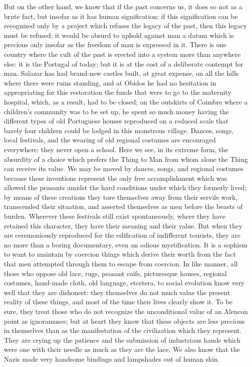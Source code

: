 \documentclass[11pt]{article}
\begin{document}
{{But on the other hand, we know that if the past concerns us, it does so not as a brute fact, but insofar as it has human signification; if this signification can be recognized only by a project which refuses the legacy of the past, then this legacy must be refused; it would be absurd to uphold against man a datum which is precious only insofar as the freedom of man is expressed in it. There is one country where the cult of the past is erected into a system more than anywhere else: it is the Portugal of today; but it is at the cost of a deliberate contempt for man. Salazar has had brand-new castles built, at great expense, on all the hills where there were ruins standing, and at Obidos he had no hesitation in appropriating for this restoration the funds that were to go to the maternity hospital, which, as a result, had to be closed; on the outskirts of Coimbre where a children’s community was to be set up, he spent so much money having the different types of old Portuguese houses reproduced on a reduced scale that barely four children could be lodged in this monstrous village. Dances, songs, local festivals, and the wearing of old regional costumes are encouraged everywhere: they never open a school. Here we see, in its extreme form, the absurdity of a choice which prefers the Thing to Man from whom alone the Thing can receive its value. We may be moved by dances, songs, and regional costumes because these inventions represent the only free accomplishment which was allowed the peasants amidst the hard conditions under which they formerly lived; by means of these creations they tore themselves away from their servile work, transcended their situation, and asserted themselves as men before the beasts of burden. Wherever these festivals still exist spontaneously, where they have retained this character, they have their meaning and their value. But when they are ceremoniously reproduced for the edification of indifferent tourists, they are no more than a boring documentary, even an odious mystification. It is a sophism to want to maintain by coercion things which derive their worth from the fact that men attempted through them to escape from coercion. In like manner, all those who oppose old lace, rugs, peasant coifs, picturesque houses, regional costumes, hand-made cloth, old language, etcetera, to social evolution know very well that they are dishonest: they themselves do not much value the present reality of these things, and most of the time their lives clearly show it. To be sure, they treat those who do not recognize the unconditional value of an Alencon point as ignoramuses; but at heart they know that these objects are less precious in themselves than as the manifestation of the civilization which they represent. They are crying up the patience and the submission of industrious hands which were one with their needle as much as they are the lace. We also know that the Nazis made very handsome bindings and lampshades out of human skin.

}}
\end{document}
